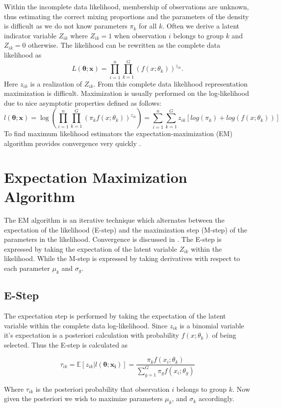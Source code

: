 \documentclass[12pt,letterpaper]{report}
\theoremstyle{definition}
\begin{document}
Within the incomplete data likelihood, membership of observations are unknown, thus estimating the correct mixing proportions and the parameters of the density is difficult as we do not know parameters $\pi_k$ for all $k$. Often we derive a latent indicator variable $Z_{ik}$ where $Z_{ik} = 1$ when observation $i$ belongs to group $k$ and $Z_{ik} = 0$ otherwise. The likelihood can be rewritten as the complete data likelihood as 
$$ L(\bm{\theta}; \bm{x}) = \prod_{i=1}^n\prod_{k=1}^G ( f(x;\theta_k) )^{z_{ik}} . $$
Here $z_{ik}$ is a realization of $Z_{ik}$. From this complete data likelihood representation maximization is difficult. Maximization is usually performed on the log-likelihood due to nice asymptotic properties defined as follows: 
$$ l(\bm{\theta}; \bm{x}) = \log( \prod_{i=1}^n\prod_{k=1}^G (\pi_{k} f(x;\theta_k) )^{z_{ik}} ) = \sum_{i=1}^n \sum_{k=1}^G  z_{ik} [ log(\pi_k) + log(f(x;\theta_k))] $$
 To find maximum likelihood estimators the expectation-maximization (EM) algorithm provides convergence very quickly \citep{demp}. 

\section{Expectation Maximization Algorithm}

The EM algorithm is an iterative technique which alternates between the expectation of the likelihood (E-step) and the maximization step (M-step) of the parameters in the likelihood. Convergence is discussed in \cite{demp}. The E-step is expressed by taking the expectation of the latent variable $Z_{ik}$ within the likelihood. While the M-step is  expressed by taking derivatives with respect to each parameter $\mu_k$ and $\sigma_g$.  
\subsection{E-Step}
The expectation step is performed by taking the expectation of the latent variable within the complete data log-likelihood. 
Since $z_{ik}$ is a binomial variable it's expectation is a posteriori calculation with probability $f(x;\theta_k)$ of being selected. Thus the E-step is calculated as 

$$\tau_{ik} =  \mathbb{E} [z_{ik} | l(\bm{\theta}; \bm{x_i})] = \frac{ \pi_k f(x_i;\theta_k)}{\sum_{g=1}^G \pi_g f(x_i;\theta_g)} $$

Where $\tau_{ik}$ is the posteriori probability that observation $i$ belongs to group $k$. Now given the posteriori we wish to maximize parameters $\mu_k$, and $\sigma_k$ accordingly.






\end{document}
